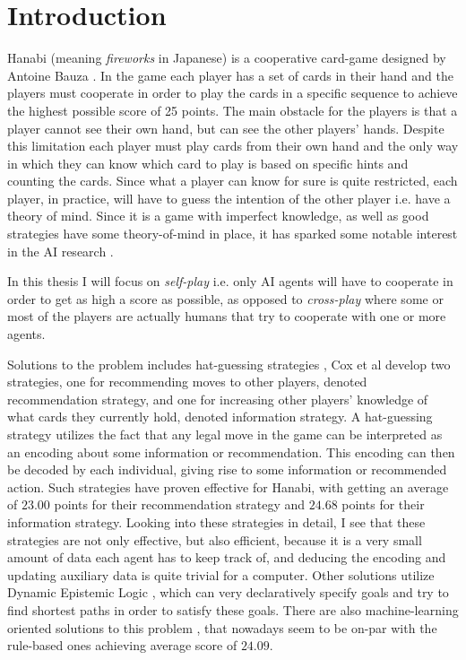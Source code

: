 \section{Introduction}

Hanabi (meaning \emph{fireworks} in Japanese) is a cooperative card-game designed by Antoine Bauza \cite{BGGHanabi}. 
In the game each player has a set of cards in their hand and the players must cooperate in order to play the cards in a specific sequence to achieve the highest possible score of 25 points.
The main obstacle for the players is that a player cannot see their own hand, but can see the other players' hands. 
Despite this limitation each player must play cards from their own hand and the only way in which they can know which card to play is based on specific hints and counting the cards. 
Since what a player can know for sure is quite restricted, each player, in practice, will have to guess the intention of the other player i.e. have a theory of mind. 
Since it is a game with imperfect knowledge, as well as good strategies have some theory-of-mind in place, it has sparked some notable interest in the AI research \cite{DeepmindAndOthers}. 

In this thesis I will focus on \emph{self-play} i.e. only AI agents will have to cooperate in order to get as high a score as possible, as opposed to \emph{cross-play} where some or most of the players are actually humans that try to cooperate with one or more agents.  

Solutions to the problem includes hat-guessing strategies \cite{CoxEtAl2015}, Cox et al develop two strategies, one for recommending moves to other players, denoted recommendation strategy, and one for increasing other players' knowledge of what cards they currently hold, denoted information strategy. 
A hat-guessing strategy utilizes the fact that any legal move in the game can be interpreted as an encoding about some information or recommendation.
This encoding can then be decoded by each individual, giving rise to some information or recommended action. 
Such strategies have proven effective for Hanabi, with \cite{CoxEtAl2015} getting an average of $23.00$ points for their recommendation strategy and $24.68$ points for their information strategy. 
Looking into these strategies in detail, I see that these strategies are not only effective, but also efficient, because it is a very small amount of data each agent has to keep track of, and deducing the encoding and updating auxiliary data is quite trivial for a computer.
Other solutions utilize Dynamic Epistemic Logic \cite{EgerAndMartens17}, which can very declaratively specify goals and try to find shortest paths in order to satisfy these goals. 
There are also machine-learning oriented solutions to this problem \cite{hu2021otherplay}, that nowadays seem to be on-par with the rule-based ones achieving average score of $24.09$.

